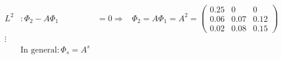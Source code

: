 \begin{enumerate}
\begin{solution}
\begin{align}
                  L^2 & : \Phi_2 - A \Phi_1                          & = 0 \Rightarrow   & \Phi_2 = A \Phi_1 = A^2 = \begin{pmatrix}0.25&0&0\\0.06&0.07&0.12\\0.02&0.08&0.15 \end{pmatrix}\nonumber \\
                  \vdots\nonumber                                                                                                                                                                   \\
                      & \text{In general}: \Phi_s = A^s \label{allg}
              \end{align}
          \end{solution}
\end{enumerate}


\newpage
